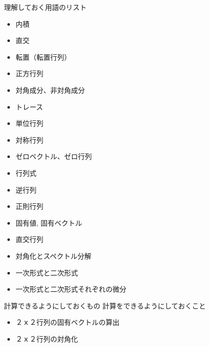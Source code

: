 \documentclass[dvipdfmx,autodetect-engine, unicode, 10pt, aspectratio=169]{beamer}
\begin{document}
\begin{frame}{理解しておく用語のリスト}
    \begin{minipage}[t]{0.45\linewidth}
    \begin{itemize}
        \item 内積
        \item 直交
        \item 転置（転置行列）
        \item 正方行列
        \item 対角成分、非対角成分
        \item トレース
        \item 単位行列
        \item 対称行列
        \item ゼロベクトル、ゼロ行列
    \end{itemize}
    \end{minipage}
    \begin{minipage}[t]{0.45\linewidth}
    \begin{itemize}
        \item 行列式
        \item 逆行列
        \item 正則行列
        \item 固有値, 固有ベクトル
        \item 直交行列
        \item 対角化とスペクトル分解
        \item 一次形式と二次形式
        \item 一次形式と二次形式それぞれの微分
    \end{itemize}
    \end{minipage}
\end{frame}

\begin{frame}{計算できるようにしておくもの}
    計算をできるようにしておくこと
    \begin{itemize}
        \item ２ｘ２行列の固有ベクトルの算出
        \item ２ｘ２行列の対角化
    \end{itemize}
\end{frame}
\end{document}
